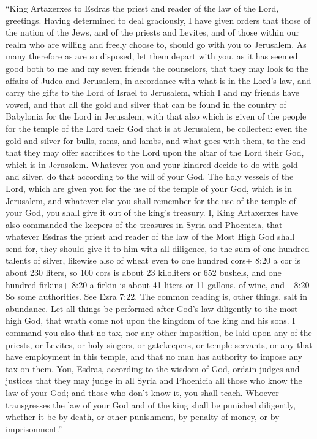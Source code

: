  ``King Artaxerxes to Esdras the priest and reader of the
law of the Lord, greetings.  Having determined to deal
graciously, I have given orders that those of the nation of the Jews,
and of the priests and Levites, and of those within our realm who are
willing and freely choose to, should go with you to Jerusalem.
 As many therefore as are so disposed, let them depart with
you, as it has seemed good both to me and my seven friends the
counselors,  that they may look to the affairs of Judea and
Jerusalem, in accordance with what is in the Lord's law, 
and carry the gifts to the Lord of Israel to Jerusalem, which I and my
friends have vowed, and that all the gold and silver that can be found
in the country of Babylonia for the Lord in Jerusalem, 
with that also which is given of the people for the temple of the Lord
their God that is at Jerusalem, be collected: even the gold and silver
for bulls, rams, and lambs, and what goes with them,  to
the end that they may offer sacrifices to the Lord upon the altar of the
Lord their God, which is in Jerusalem.  Whatever you and
your kindred decide to do with gold and silver, do that according to the
will of your God.  The holy vessels of the Lord, which are
given you for the use of the temple of your God, which is in Jerusalem,
 and whatever else you shall remember for the use of the
temple of your God, you shall give it out of the king's treasury.
 I, King Artaxerxes have also commanded the keepers of the
treasures in Syria and Phoenicia, that whatever Esdras the priest and
reader of the law of the Most High God shall send for, they should give
it to him with all diligence,  to the sum of one hundred
talents of silver, likewise also of wheat even to one hundred cors+ 8:20
a cor is about 230 liters, so 100 cors is about 23 kiloliters or 652
bushels, and one hundred firkins+ 8:20 a firkin is about 41 liters or 11
gallons. of wine, and+ 8:20 So some authorities. See Ezra 7:22. The
common reading is, other things. salt in abundance.  Let
all things be performed after God's law diligently to the most high God,
that wrath come not upon the kingdom of the king and his sons.
 I command you also that no tax, nor any other imposition,
be laid upon any of the priests, or Levites, or holy singers, or
gatekeepers, or temple servants, or any that have employment in this
temple, and that no man has authority to impose any tax on them.
 You, Esdras, according to the wisdom of God, ordain judges
and justices that they may judge in all Syria and Phoenicia all those
who know the law of your God; and those who don't know it, you shall
teach.  Whoever transgresses the law of your God and of the
king shall be punished diligently, whether it be by death, or other
punishment, by penalty of money, or by imprisonment.''

